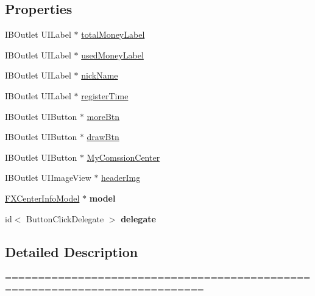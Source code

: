 \subsection*{Properties}
\begin{DoxyCompactItemize}
\item 
I\+B\+Outlet U\+I\+Label $\ast$ \mbox{\hyperlink{interface_dis_center_first_cell_ad62cb85ba749778eb4e07b645985a5f7}{total\+Money\+Label}}
\item 
I\+B\+Outlet U\+I\+Label $\ast$ \mbox{\hyperlink{interface_dis_center_first_cell_a16f8f7ea88ee05ace8802008e2a73acc}{used\+Money\+Label}}
\item 
I\+B\+Outlet U\+I\+Label $\ast$ \mbox{\hyperlink{interface_dis_center_first_cell_a64b84a07a76216a1317bbb77697371a2}{nick\+Name}}
\item 
I\+B\+Outlet U\+I\+Label $\ast$ \mbox{\hyperlink{interface_dis_center_first_cell_a0b706c701de37bb7ee2d8d9180dd12d9}{register\+Time}}
\item 
I\+B\+Outlet U\+I\+Button $\ast$ \mbox{\hyperlink{interface_dis_center_first_cell_a98493934b86bccf0994c111d6b7a2adf}{more\+Btn}}
\item 
I\+B\+Outlet U\+I\+Button $\ast$ \mbox{\hyperlink{interface_dis_center_first_cell_a43397333db980b537e1d6de2c2d2c3dd}{draw\+Btn}}
\item 
I\+B\+Outlet U\+I\+Button $\ast$ \mbox{\hyperlink{interface_dis_center_first_cell_ab887af02e0ace8fc8fbaef72b7ad2e73}{My\+Comssion\+Center}}
\item 
I\+B\+Outlet U\+I\+Image\+View $\ast$ \mbox{\hyperlink{interface_dis_center_first_cell_a88e974f684b7d64a60b384d261e48929}{header\+Img}}
\item 
\mbox{\label{interface_dis_center_first_cell_aa70f6299c1ea18a7ba978662fcbf7fbd}} 
\mbox{\hyperlink{interface_f_x_center_info_model}{F\+X\+Center\+Info\+Model}} $\ast$ {\bfseries model}
\item 
\mbox{\label{interface_dis_center_first_cell_ace9a116502c8cb9a82a1d7567e6bec15}} 
id$<$ Button\+Click\+Delegate $>$ {\bfseries delegate}
\end{DoxyCompactItemize}


\subsection{Detailed Description}
============================================================================

